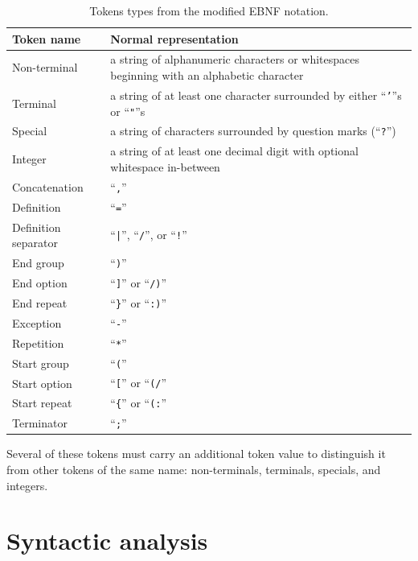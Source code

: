 \documentclass[english,engineering]{wizthesis}
\begin{document}
\begin{longtable}[c]{@{}lm{9cm}@{}}
  \caption{Tokens types from the modified EBNF notation.}
  \label{tab:tokens}\\
  \toprule
  Token name & Normal representation \\* \midrule
  \endfirsthead
  \endhead
  \endfoot
  \endlastfoot
  Non-terminal & a string of alphanumeric characters or whitespaces beginning
  with an alphabetic character \\
  Terminal & a string of at least one character surrounded by either
  ``\texttt{'}''s or ``\texttt{"}''s \\
  Special & a string of characters surrounded by question marks (``\texttt{?}'')
  \\
  Integer & a string of at least one decimal digit with optional whitespace
  in-between \\
  Concatenation & ``\texttt{,}'' \\
  Definition & ``\texttt{=}'' \\
  Definition separator & ``\texttt{|}'', ``\texttt{/}'', or ``\texttt{!}'' \\
  End group & ``\texttt{)}'' \\
  End option & ``\texttt{]}'' or ``\texttt{/)}'' \\
  End repeat & ``\texttt{\}}'' or ``\texttt{:)}'' \\
  Exception & ``\texttt{-}'' \\
  Repetition & ``\texttt{*}'' \\
  Start group & ``\texttt{(}'' \\
  Start option & ``\texttt{[}'' or ``\texttt{(/}'' \\
  Start repeat & ``\texttt{\{}'' or ``\texttt{(:}'' \\
  Terminator & ``\texttt{;}'' \\* \bottomrule
\end{longtable}

Several of these tokens must carry an additional token value to distinguish it
from other tokens of the same name: non-terminals, terminals, specials, and
integers.

\section{Syntactic analysis} \label{sec:parsing}
\end{document}
